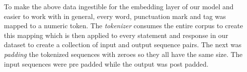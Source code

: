 To make the above data ingestible for the embedding layer of our model and easier to work with in general, every word, punctuation mark and tag was mapped to a numeric token. 
The \emph{tokenizer} consumes the entire corpus to create this mapping which is then applied to every statement and response in our dataset to create a collection of input and output sequence pairs.
The next was \emph{padding} the tokenized sequences with zeroes so they all have the same size.
The input sequences were pre padded while the output was post padded.
%
%
%
%
%    
%

